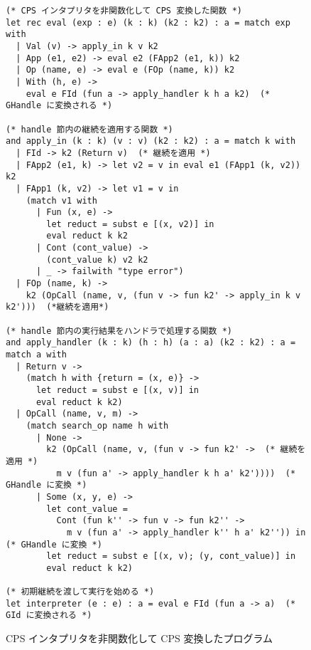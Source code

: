 \begin{figure}[!b]
\begin{spacing}{0.9}
\begin{verbatim}
(* CPS インタプリタを非関数化して CPS 変換した関数 *)
let rec eval (exp : e) (k : k) (k2 : k2) : a = match exp with
  | Val (v) -> apply_in k v k2
  | App (e1, e2) -> eval e2 (FApp2 (e1, k)) k2
  | Op (name, e) -> eval e (FOp (name, k)) k2
  | With (h, e) ->
    eval e FId (fun a -> apply_handler k h a k2)  (* GHandle に変換される *)

(* handle 節内の継続を適用する関数 *)
and apply_in (k : k) (v : v) (k2 : k2) : a = match k with
  | FId -> k2 (Return v)  (* 継続を適用 *)
  | FApp2 (e1, k) -> let v2 = v in eval e1 (FApp1 (k, v2)) k2
  | FApp1 (k, v2) -> let v1 = v in
    (match v1 with
      | Fun (x, e) ->
        let reduct = subst e [(x, v2)] in
        eval reduct k k2
      | Cont (cont_value) ->
        (cont_value k) v2 k2
      | _ -> failwith "type error")
  | FOp (name, k) ->
    k2 (OpCall (name, v, (fun v -> fun k2' -> apply_in k v k2')))  (*継続を適用*)

(* handle 節内の実行結果をハンドラで処理する関数 *)
and apply_handler (k : k) (h : h) (a : a) (k2 : k2) : a = match a with
  | Return v ->
    (match h with {return = (x, e)} ->
      let reduct = subst e [(x, v)] in
      eval reduct k k2)
  | OpCall (name, v, m) ->
    (match search_op name h with
      | None ->
        k2 (OpCall (name, v, (fun v -> fun k2' ->  (* 継続を適用 *)
          m v (fun a' -> apply_handler k h a' k2'))))  (* GHandle に変換 *)
      | Some (x, y, e) ->
        let cont_value =
          Cont (fun k'' -> fun v -> fun k2'' ->
            m v (fun a' -> apply_handler k'' h a' k2'')) in  (* GHandle に変換 *)
        let reduct = subst e [(x, v); (y, cont_value)] in
        eval reduct k k2)

(* 初期継続を渡して実行を始める *)
let interpreter (e : e) : a = eval e FId (fun a -> a)  (* GId に変換される *)
\end{verbatim}
\caption{CPS インタプリタを非関数化して CPS 変換したプログラム}
\label{figure:3cps}
\end{spacing}
\end{figure}

